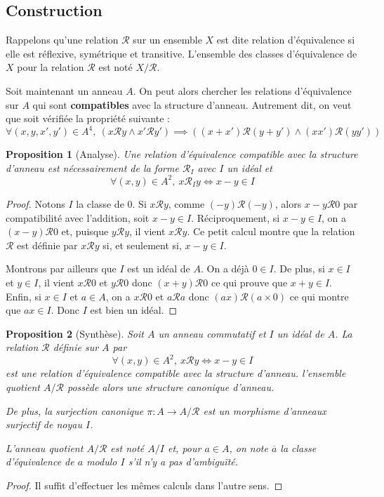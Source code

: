 \documentclass[french]{book}
\theoremstyle{plain}
\newtheorem{prop}{Proposition}[chapter]
\theoremstyle{definition}
\theoremstyle{remark}
\begin{document}
\subsection{Construction}
Rappelons qu'une relation $\mathcal{R}$ sur un ensemble $X$ est dite relation d'équivalence si elle est réflexive, symétrique et transitive. L'ensemble des classes d'équivalence de $X$ pour la relation $\mathcal{R}$ est noté $X/\mathcal{R}$. \\ \par Soit maintenant un anneau $A$. On peut alors chercher les relations d'équivalence sur $A$ qui sont \textbf{compatibles} avec la structure d'anneau. Autrement dit, on veut que soit vérifiée la propriété suivante : $$\forall (x,y,x',y')\in A^4,\ (x\mathcal{R}y \land x'\mathcal{R}y')\implies((x+x')\mathcal{R}(y+y')\land(xx')\mathcal{R}(yy'))$$
\begin{prop}[Analyse]
	Une relation d'équivalence compatible avec la structure d'anneau est nécessairement de la forme $\mathcal{R}_I$ avec $I$ un idéal et $$\forall (x,y)\in A^2,\ x\mathcal{R}_Iy\iff x-y\in I$$
\end{prop}
\begin{proof}
	Notons $I$ la classe de $0$. Si $x\mathcal{R}y$, comme $(-y)\mathcal{R}(-y)$, alors $x-y\mathcal{R}0$ par compatibilité avec l'addition, soit $x-y\in I$. Réciproquement, si $x-y\in I$, on a $(x-y)\mathcal{R}0$ et, puisque $y\mathcal{R}y$, il vient $x\mathcal{R}y$. Ce petit calcul montre que la relation $\mathcal{R}$ est définie par $x\mathcal{R}y$ si, et seulement si, $x-y\in I$. \\ \par Montrons par ailleurs que $I$ est un idéal de $A$. On a déjà $0\in I$. De plus, si $x\in I$ et $y\in I$, il vient $x\mathcal{R}0$ et $y\mathcal{R}0$ donc $(x+y)\mathcal{R}0$ ce qui prouve que $x+y\in I$. Enfin, si $x\in I$ et $a\in A$, on a $x\mathcal{R}0$ et $a\mathcal{R}a$ donc $(ax)\mathcal{R}(a\times 0)$ ce qui montre que $ax\in I$. Donc $I$ est bien un idéal.
\end{proof}
\begin{prop}[Synthèse]
	Soit $A$ un anneau commutatif et $I$ un idéal de $A$. La relation $\mathcal{R}$ définie sur $A$ par $$\forall (x,y)\in A^2,\ x\mathcal{R}y\iff x-y\in I$$ est une relation d'équivalence compatible avec la structure d'anneau. l'ensemble quotient $A/\mathcal{R}$ possède alors une structure canonique d'anneau. \\ \par De plus, la surjection canonique $\pi:A\rightarrow A/\mathcal{R}$ est un morphisme d'anneaux surjectif de noyau $I$. \\ \par L'anneau quotient $A/\mathcal{R}$ est noté $A/I$ et, pour $a\in A$, on note $\overline{a}$ la classe d'équivalence de $a$ modulo $I$ s'il n'y a pas d'ambiguïté.
\end{prop}
\begin{proof}
	Il suffit d'effectuer les mêmes calculs dans l'autre sens.
\end{proof}
\end{document}
